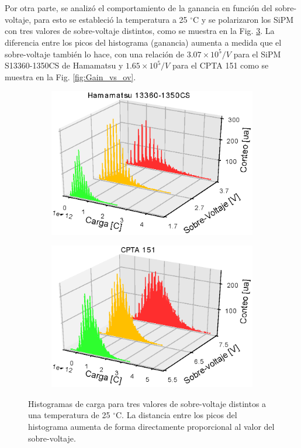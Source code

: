 \\ \\
Por otra parte, se analizó el comportamiento de la ganancia en función del sobre-voltaje, para esto se estableció la temperatura a 25 $^\circ$C y se polarizaron los SiPM con tres valores de sobre-voltaje distintos, como se muestra en la Fig. \ref{fig:His_G_vs_ov}. La diferencia entre los picos del histograma (ganancia) aumenta a medida que el sobre-voltaje también lo hace, con una relación de $3.07\times10^5/V$ para el SiPM  S13360-1350CS de Hamamatsu y $1.65\times10^5/V$ para el CPTA 151 como se muestra en la Fig. \ref{fig:Gain_vs_ov}. 
\begin{figure}[h!]
     \centering
     \begin{subfigure}[b]{0.49\textwidth}
         \centering
         \includegraphics[width=1.1\textwidth]{Images/G_ov_1350CS.eps}
         \caption{}
         \label{fig:G_vs_ov_1350CS}
     \end{subfigure}
     \begin{subfigure}[b]{0.49\textwidth}
         \centering
         \includegraphics[width=1.1\textwidth]{Images/G_ov_CPTA151.eps}
         \caption{}
         \label{fig:G_vs_ov_CPTA}
     \end{subfigure}
        \caption{Histogramas de carga para tres valores de sobre-voltaje distintos a una temperatura de 25 $^\circ$C. La distancia entre los picos del histograma aumenta de forma directamente proporcional al valor del sobre-voltaje.}
        \label{fig:His_G_vs_ov}
\end{figure}

